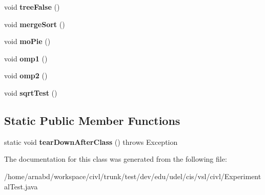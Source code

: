 \begin{DoxyCompactItemize}
\item 
\hypertarget{classedu_1_1udel_1_1cis_1_1vsl_1_1civl_1_1ExperimentalTest_a40b4f715ae464114fb341f0826b736ba}{}void {\bfseries tree\+False} ()\label{classedu_1_1udel_1_1cis_1_1vsl_1_1civl_1_1ExperimentalTest_a40b4f715ae464114fb341f0826b736ba}

\item 
\hypertarget{classedu_1_1udel_1_1cis_1_1vsl_1_1civl_1_1ExperimentalTest_a3d0bfef12ce1b26b8b572fcd06cb6620}{}void {\bfseries merge\+Sort} ()\label{classedu_1_1udel_1_1cis_1_1vsl_1_1civl_1_1ExperimentalTest_a3d0bfef12ce1b26b8b572fcd06cb6620}

\item 
\hypertarget{classedu_1_1udel_1_1cis_1_1vsl_1_1civl_1_1ExperimentalTest_afc5f45bed9aa36ca02c8d161256b18fe}{}void {\bfseries mo\+Pie} ()\label{classedu_1_1udel_1_1cis_1_1vsl_1_1civl_1_1ExperimentalTest_afc5f45bed9aa36ca02c8d161256b18fe}

\item 
\hypertarget{classedu_1_1udel_1_1cis_1_1vsl_1_1civl_1_1ExperimentalTest_a7581be10d1d6341ca0ad2322f5c21485}{}void {\bfseries omp1} ()\label{classedu_1_1udel_1_1cis_1_1vsl_1_1civl_1_1ExperimentalTest_a7581be10d1d6341ca0ad2322f5c21485}

\item 
\hypertarget{classedu_1_1udel_1_1cis_1_1vsl_1_1civl_1_1ExperimentalTest_affa39099c6d79e638cb90734dd820d89}{}void {\bfseries omp2} ()\label{classedu_1_1udel_1_1cis_1_1vsl_1_1civl_1_1ExperimentalTest_affa39099c6d79e638cb90734dd820d89}

\item 
\hypertarget{classedu_1_1udel_1_1cis_1_1vsl_1_1civl_1_1ExperimentalTest_a006cb93386c247621ad67cfe06fc17af}{}void {\bfseries sqrt\+Test} ()\label{classedu_1_1udel_1_1cis_1_1vsl_1_1civl_1_1ExperimentalTest_a006cb93386c247621ad67cfe06fc17af}

\end{DoxyCompactItemize}
\subsection*{Static Public Member Functions}
\begin{DoxyCompactItemize}
\item 
\hypertarget{classedu_1_1udel_1_1cis_1_1vsl_1_1civl_1_1ExperimentalTest_a4c6a3740f4f6fd419698296b18c9e5d1}{}static void {\bfseries tear\+Down\+After\+Class} ()  throws Exception \label{classedu_1_1udel_1_1cis_1_1vsl_1_1civl_1_1ExperimentalTest_a4c6a3740f4f6fd419698296b18c9e5d1}

\end{DoxyCompactItemize}


The documentation for this class was generated from the following file\+:\begin{DoxyCompactItemize}
\item 
/home/arnabd/workspace/civl/trunk/test/dev/edu/udel/cis/vsl/civl/Experimental\+Test.\+java\end{DoxyCompactItemize}
